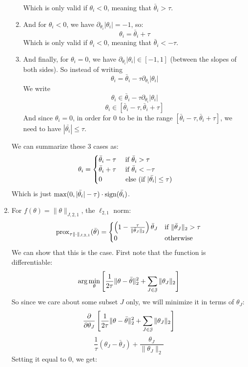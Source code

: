 \documentclass[12pt]{article}
\begin{document}
\begin{enumerate}[label = \letters]
\begin{enumerate}[label = \numbers]
        Which is only valid if $\theta_i < 0$,
        meaning that $\bar{\theta}_i > \tau$.
        \item
        And for $\theta_i < 0$,
        we have $\partial_{\theta_i} |\theta_i| = -1$, so:
        \[ \theta_i = \bar{\theta}_i + \tau \]
        Which is only valid if $\theta_i < 0$,
        meaning that $\bar{\theta}_i < -\tau$.
        \item
        And finally, for $\theta_i = 0$,
        we have $\partial_{\theta_i} |\theta_i|
        \in [-1, 1]$ (between the slopes of both sides).
        So instead of writing
        \[ \theta_i = \bar{\theta}_i 
        - \tau\partial_{\theta_i} |\theta_i| \]
        We write
        \[ \theta_i \in \bar{\theta}_i 
        - \tau\partial_{\theta_i} |\theta_i| \]
        \[ \theta_i \in [\bar{\theta}_i - \tau, 
        \bar{\theta}_i + \tau] \]
        And since $\theta_i = 0$,
        in order for $0$ to be in the range 
        $[\bar{\theta}_i - \tau, 
        \bar{\theta}_i + \tau]$, we need to have
        $|\bar{\theta_i}| \leq \tau$.
        \end{enumerate}
        We can summarize these 3 cases as:
        \[ \theta_i = \begin{cases} 
            \bar{\theta}_i - \tau \quad 
            \text{ if } \bar{\theta}_i > \tau \\
            \bar{\theta}_i + \tau \quad 
            \text{ if } \bar{\theta}_i < -\tau \\
            0 \quad \quad \quad \;\, \text{else
            (if $|\bar{\theta_i}| \leq \tau$)}
         \end{cases} \]
        Which is just $\max(0, |\bar{\theta_i}| - \tau)
        \cdot \text{sign}(\bar{\theta_i})$.
    \item
    For $f(\theta) = \|\theta\|_{J, 2, 1}$,
    the $\ell_{2, 1}$ norm:
    \[ \mathrm{prox}_{\tau \|\cdot\|_{J,2,1}}(\bar{\theta}) 
    = \begin{cases} \left( 1 - \frac{\tau}{\|\bar{\theta}_J\|_2} \right) 
    \bar{\theta}_J & \text{if } \|\bar{\theta}_J\|_2 > 
    \tau \\ 0 & \text{otherwise} \end{cases} \]
    We can show that this is the case.
    First note that the function is differentiable:
    \[\arg\min_{\theta} \left[  \frac{1}{2\tau} \|\theta - 
    \bar{\theta}\|_2^2 + \sum_{J \in \mathcal{J}} 
    \|\theta_J\|_2 \right] \]
    So since we care about some subset $J$
    only, we will minimize it in terms of $\theta_J$:
    \[ \dfrac{\partial }{\partial \theta_J} 
    \left[  \frac{1}{2\tau} \|\theta - 
    \bar{\theta}\|_2^2 + \sum_{J \in \mathcal{J}} 
    \|\theta_J\|_2 \right] \]
    \[ \frac{1}{\tau}(\theta_J - 
    \bar{\theta}_J) + \dfrac{\theta_J}{\|\theta_J\|_2} \]
    Setting it equal to $0$, we get:

\end{enumerate}
\end{document}
